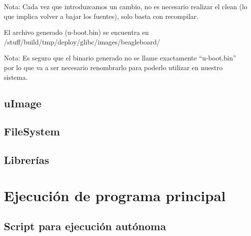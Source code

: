 Nota: Cada vez que introduzcamos un cambio, no es necesario realizar el clean (lo que implica volver a bajar los fuentes), solo basta con recompilar.

El archivo generado (u-boot.bin) se encuentra en /stuff/build/tmp/deploy/glibc/images/beagleboard/

Nota: Es seguro que el binario generado no se llame exactamente “u-boot.bin” por lo que va a ser necesario renombrarlo para poderlo utilizar en nuestro sistema.

\subsection{uImage}
\subsection{FileSystem}
\subsection{Librerías}

\section{Ejecución de programa principal}
\subsection{Script para ejecución autónoma}
